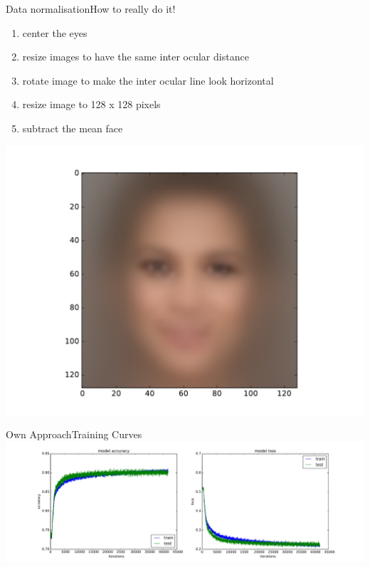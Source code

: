 \documentclass{beamer}
\begin{document}
\begin{frame}{Data normalisation}{How to really do it!}
\begin{enumerate}
\item center the eyes
\item resize images to have the same inter ocular distance
\item rotate image to make the inter ocular line look horizontal
\item resize image to 128 x 128 pixels
\item subtract the mean face
\end{enumerate}
\centering
	\includegraphics[height=0.6\textheight]{figures/meanFace} 
\end{frame}

\begin{frame}{Own Approach}{Training Curves}
\hspace*{-2.4cm}
	\includegraphics[height=0.6\textheight]{figures/lossGood} 
\end{frame}
\end{document}
